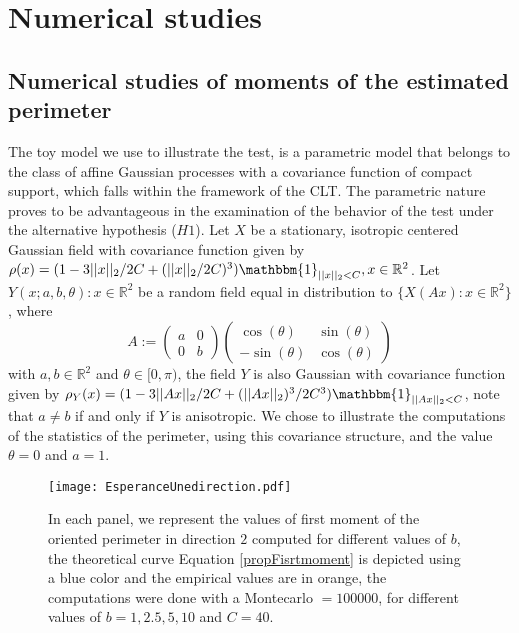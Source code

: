 \documentclass[12pt]{article}
\theoremstyle{Theorem}
\theoremstyle{definition}
\newcounter{Ax}
\begin{document}
\section{Numerical studies}
\subsection{Numerical studies of moments of the estimated perimeter}
The toy model we use to illustrate the test, is a parametric model that belongs to the class of affine Gaussian processes with a covariance function of compact support, which falls within the framework of the CLT. The parametric nature proves to be advantageous in the examination of the behavior of the test under the alternative hypothesis ($H1$). 
Let $X$ be a stationary, isotropic centered Gaussian field with covariance function given by $\rho(x) = (1 -3||x||_{2}/2C + (||x||_{2}/2C)^{3})\mathbbm{1}_{||x||_{2} < C}, x \in \mathbb{R}^2$.
Let ${Y(x; a, b, \theta): x \in \mathbb{R}^{2}}$ be a random field equal in distribution to  $\{X(Ax): x\in \mathbb{R}^{2}\}$, where 
\begin{equation}
A:= \begin{pmatrix} a & 0 \\ 0 & b\end{pmatrix} \begin{pmatrix} \cos(\theta) & \sin(\theta) \\ -\sin(\theta) & \cos(\theta)\end{pmatrix} 
\end{equation}
with $a, b \in \mathbb{R}^{2}$ and $\theta \in [0, \pi)$, the field $Y$ is also Gaussian with covariance function given by  $\rho_{Y}(x) = (1 - 3||Ax||_{2}/2C + (||Ax||_{2})^{3}/2C^{3})\mathbbm{1}_{||Ax||_{2} < C}$, note that $a\neq b$ if and only if $Y$ is anisotropic. We chose to illustrate the computations of the statistics of the perimeter, using this covariance structure, and the value $\theta = 0$ and $a = 1$. 
\begin{figure}[H]
  \centering
    {\texttt{[image: EsperanceUnedirection.pdf]}}
    \hspace{0.2cm}
 \caption{In each panel, we represent the values of first moment of the oriented perimeter in direction $2$ computed for different values of $b$, the theoretical curve Equation \eqref{propFisrtmoment} is depicted using a blue color and the empirical values are in orange, the computations were done with a Montecarlo $= 100000$, for different values of $b = 1, 2.5, 5, 10$ and $C = 40$. }
\label{fig2}
\end{figure}
\end{document}
